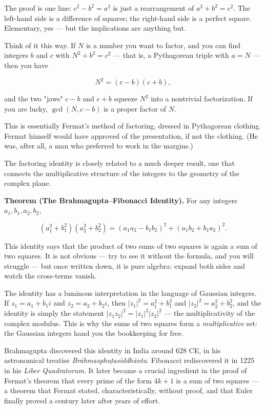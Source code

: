 \documentclass[11pt,openright,twoside]{book}
\theoremstyle{definition}
\begin{document}
The proof is one line: $c^2 - b^2 = a^2$ is just a rearrangement of $a^2 + b^2 = c^2$. The left-hand side is a difference of squares; the right-hand side is a perfect square. Elementary, yes --- but the implications are anything but.

Think of it this way. If $N$ is a number you want to factor, and you can find integers $b$ and $c$ with $N^2 + b^2 = c^2$ --- that is, a Pythagorean triple with $a = N$ --- then you have

\[N^2 = (c - b)(c + b),\]

and the two "jaws" $c - b$ and $c + b$ squeeze $N^2$ into a nontrivial factorization. If you are lucky, $\gcd(N, c - b)$ is a proper factor of $N$.

This is essentially Fermat's method of factoring, dressed in Pythagorean clothing. Fermat himself would have approved of the presentation, if not the clothing. (He was, after all, a man who preferred to work in the margins.)

The factoring identity is closely related to a much deeper result, one that connects the multiplicative structure of the integers to the geometry of the complex plane.

\textbf{Theorem (The Brahmagupta--Fibonacci Identity).} For any integers $a_1, b_1, a_2, b_2$,

\[(a_1^2 + b_1^2)(a_2^2 + b_2^2) = (a_1 a_2 - b_1 b_2)^2 + (a_1 b_2 + b_1 a_2)^2.\]

This identity says that the product of two sums of two squares is again a sum of two squares. It is not obvious --- try to see it without the formula, and you will struggle --- but once written down, it is pure algebra: expand both sides and watch the cross-terms vanish.

The identity has a luminous interpretation in the language of Gaussian integers. If $z_1 = a_1 + b_1 i$ and $z_2 = a_2 + b_2 i$, then $|z_1|^2 = a_1^2 + b_1^2$ and $|z_2|^2 = a_2^2 + b_2^2$, and the identity is simply the statement $|z_1 z_2|^2 = |z_1|^2 |z_2|^2$ --- the multiplicativity of the complex modulus. This is why the sums of two squares form a \textit{multiplicative} set: the Gaussian integers hand you the bookkeeping for free.

Brahmagupta discovered this identity in India around 628 CE, in his astronomical treatise \textit{Brāhmasphuṭasiddhānta}. Fibonacci rediscovered it in 1225 in his \textit{Liber Quadratorum}. It later became a crucial ingredient in the proof of Fermat's theorem that every prime of the form $4k + 1$ is a sum of two squares --- a theorem that Fermat stated, characteristically, without proof, and that Euler finally proved a century later after years of effort.
\end{document}
